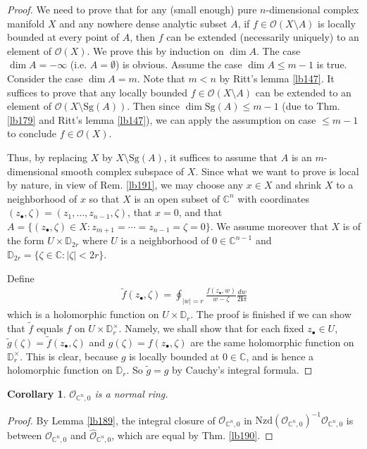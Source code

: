 \documentclass[12pt,b5paper,notitlepage]{report}
\theoremstyle{definition}
\theoremstyle{plain}
\newtheorem{co}[df]{Corollary}
\newcommand{\wtd}{\widetilde}
\newcommand{\scr}{\mathscr}
\newcommand{\im}{\mathbf{i}}
\newcommand{\blt}{\bullet}
\newcommand{\Cbb}{\mathbb C}
\newcommand{\Dbb}{\mathbb D}
\newcommand{\Sg}{\mathrm{Sg}}
\newcommand{\Nzd}{\mathrm{Nzd}}
\newcommand{\Owht}{\widehat{\scr O}}
\numberwithin{equation}{section}
\begin{document}
\begin{proof}
We need to prove that for any (small enough) pure $n$-dimensional complex manifold $X$ and any nowhere dense analytic subset $A$, if $f\in\scr O(X\setminus A)$ is locally bounded at every point of $A$, then $f$ can be extended (necessarily uniquely) to an element of $\scr O(X)$. We prove this by induction on $\dim A$. The case $\dim A=-\infty$ (i.e. $A=\emptyset$) is obvious. Assume the case $\dim A\leq m-1$ is true. Consider the case $\dim A=m$. Note that $m<n$ by Ritt's lemma \ref{lb147}. It suffices to prove that any locally bounded $f\in\scr O(X\setminus A)$ can be extended to an element of $\scr O(X\setminus\Sg(A))$. Then since $\dim\Sg(A)\leq m-1$ (due to Thm. \ref{lb179} and Ritt's lemma \ref{lb147}), we can apply the assumption on case $\leq m-1$ to conclude $f\in\scr O(X)$.

Thus, by replacing $X$ by $X\setminus\Sg(A)$, it suffices to assume that $A$ is an $m$-dimensional smooth complex subspace of $X$. Since what we want to prove is local by nature, in view of Rem. \ref{lb191}, we may choose any $x\in X$ and shrink $X$ to a neighborhood of $x$ so that $X$ is an open subset of $\Cbb^n$ with coordinates $(z_\blt,\zeta)=(z_1,\dots,z_{n-1},\zeta)$, that $x=0$, and that $A=\{(z_\blt,\zeta)\in X:z_{m+1}=\cdots=z_{n-1}=\zeta=0\}$. We assume moreover that $X$ is of the form $U\times\Dbb_{2r}$ where $U$ is a neighborhood of $0\in\Cbb^{n-1}$ and $\Dbb_{2r}=\{\zeta\in\Cbb:|\zeta|<2r\}$.

Define
\begin{align*}
\wtd f(z_\blt,\zeta)=\oint_{|w|=r}\frac{f(z_\blt,w)}{w-\zeta}\frac{dw}{2\im\pi}
\end{align*}
which is a holomorphic function on $U\times\Dbb_r$. The proof is finished if we can show that $\wtd f$ equals $f$ on $U\times\Dbb_r^\times$. Namely, we shall show that for each fixed $z_\blt\in U$, $\wtd g(\zeta)=\wtd f(z_\blt,\zeta)$ and $g(\zeta)=f(z_\blt,\zeta)$ are the same holomorphic function on $\Dbb_r^\times$. This is clear, because $g$ is locally bounded at $0\in\Cbb$, and is hence a holomorphic function on $\Dbb_r$. So $\wtd g=g$ by Cauchy's integral formula. 
\end{proof}





\begin{co}\label{lb193}
$\scr O_{\Cbb^n,0}$ is a normal ring.
\end{co}

\begin{proof}
By Lemma \ref{lb189}, the integral closure of $\scr O_{\Cbb^n,0}$ in $\Nzd(\scr O_{\Cbb^n,0})^{-1}\scr O_{\Cbb^n,0}$ is between $\scr O_{\Cbb^n,0}$ and $\Owht_{\Cbb^n,0}$, which are equal by Thm. \ref{lb190}.
\end{proof}
\end{document}

